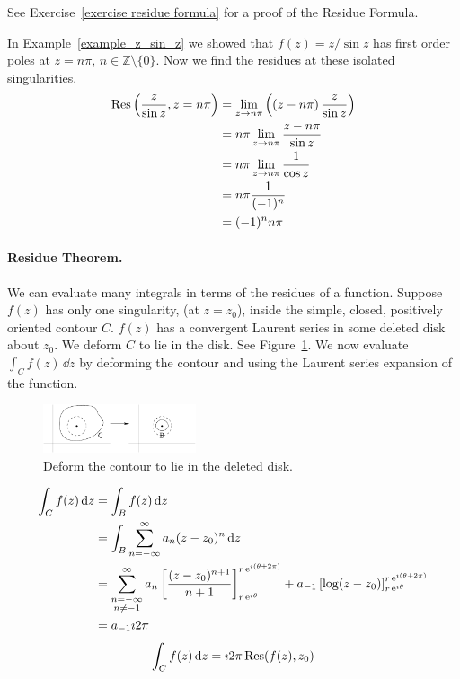 See Exercise~\ref{exercise residue formula} for a proof of the Residue Formula.




\begin{Example}
  In Example~\ref{example_z_sin_z} we showed that $f(z) = z/\sin z$ 
  has first order poles at $z = n \pi$, $n \in \mathbb{Z} \setminus \{ 0 \}$.
  Now we find the residues at these isolated singularities.
  \begin{align*}
    \mathop{\mathrm{Res}}\nolimits \left( \frac{z}{\sin z}, z = n \pi \right)
    &= \lim_{z \to n\pi} \left( \left( z-n\pi \right) 
      \frac{z}{\sin z} \right) \\
    &= n\pi \lim_{z \to n\pi} \frac{z-n\pi}{\sin z} \\
    &= n\pi \lim_{z \to n \pi} \frac{1}{\cos z} \\
    &= n\pi \frac{1}{(-1)^n} \\
    &= (-1)^n n \pi
  \end{align*}
\end{Example}






\paragraph{Residue Theorem.}
We can evaluate many integrals in terms of the residues of a function.
Suppose $f(z)$ has only one singularity, (at $z = z_0$), inside the 
simple, closed, positively oriented contour $C$.  $f(z)$ has a convergent 
Laurent series in some deleted disk about $z_0$.  We deform $C$ to lie in 
the disk.  See Figure~\ref{deformc2b}.  We now evaluate $\int_C f(z) \,\dd z$
by deforming the contour and using the Laurent series expansion of the 
function.

\begin{figure}[tb!]
  \begin{center}
    \includegraphics[width=0.4\textwidth]{fcv/residue/deformc2b}
  \end{center}
  \caption{Deform the contour to lie in the deleted disk.}
  \label{deformc2b}
\end{figure}

\begin{align*}
  \int_C f(z) \,\mathrm{d} z
  &= \int_B f(z) \,\mathrm{d} z \\
  &= \int_B \sum_{n = - \infty}^\infty a_n (z - z_0)^n \,\mathrm{d} z \\
  &= \sum_{\substack{n = - \infty \\ n \neq -1}}^\infty a_n \left[ \frac{ (z - z_0)^{n+1} }{ n+1 } 
  \right]_{r \mathop{\mathrm{e}}\nolimits^{\imath \theta}}^{r \mathop{\mathrm{e}}\nolimits^{\imath (\theta + 2 \pi)}}
  + a_{-1} \left[ \log(z - z_0) \right]_{r \mathop{\mathrm{e}}\nolimits^{\imath \theta}}^{r \mathop{\mathrm{e}}\nolimits^{\imath (\theta + 2 \pi)}} \\
  &= a_{-1} \imath 2 \pi
\end{align*}
\[
\int_C f(z) \,\mathrm{d} z = \imath 2 \pi \mathop{\mathrm{Res}}\nolimits( f(z), z_0 )
\]


